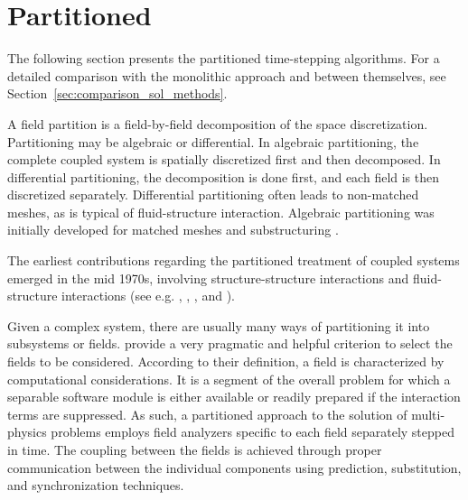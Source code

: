\section{Partitioned}

The following section presents the partitioned time-stepping algorithms.
For a detailed comparison with the monolithic approach and between themselves, see Section~\ref{sec:comparison_sol_methods}.

A field partition is a field-by-field decomposition of the space discretization.
Partitioning may be algebraic or differential.
In algebraic partitioning, the complete coupled system is spatially discretized first and then decomposed.
In differential partitioning, the decomposition is done first, and each field is then discretized separately.
Differential partitioning often leads to non-matched meshes, as is typical of fluid-structure interaction.
Algebraic partitioning was initially developed for matched meshes and substructuring \citep{felippa_partitioned_2001}.

The earliest contributions regarding the partitioned treatment of coupled systems emerged in the mid 1970s, involving structure-structure interactions and fluid-structure interactions (see e.g. \cite{belytschko_mesh_1976}, \cite{park_stabilization_1977}, \cite{belytschko_stability_1978}, \cite{hughes_implicit-explicit_1978} and \cite{belytschko_mixed_1979}).


Given a complex system, there are usually many ways of partitioning it into subsystems or fields.
\cite{felippa_staggered_1980} provide a very pragmatic and helpful criterion to select the fields to be considered.
According to their definition, a field is characterized by computational considerations.
It is a segment of the overall problem for which a separable software module is either available or readily prepared if the interaction terms are suppressed.
As such, a partitioned approach to the solution of multi-physics problems employs field analyzers specific to each field separately stepped in time.
The coupling between the fields is achieved through proper communication between the individual components using prediction, substitution, and synchronization techniques.


